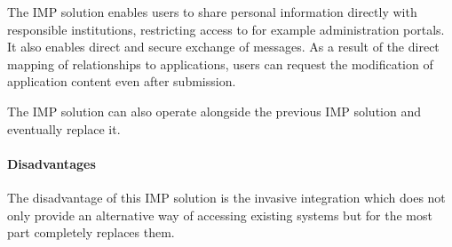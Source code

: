 The IMP solution enables users to share personal information directly with responsible institutions, restricting access to for example administration portals. It also enables direct and secure exchange of messages.
As a result of the direct mapping of relationships to applications, users can request the modification of application content even after submission.

The IMP solution can also operate alongside the previous IMP solution and eventually replace it.

\paragraph{Disadvantages}

The disadvantage of this IMP solution is the invasive integration which does not only provide an alternative way of accessing existing systems but for the most part completely replaces them.